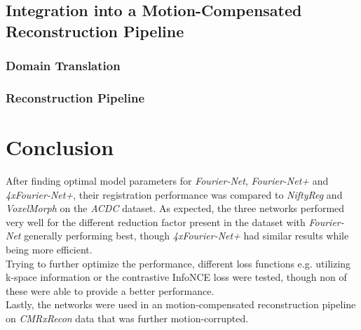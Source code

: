 \documentclass[english,version-2022-01]{uzl-thesis} %
\begin{document}
\section{Integration into a Motion-Compensated Reconstruction Pipeline} \label{Sec:DiscussionIntegrationMotion-CompensatedReconstructionPipeline}


\subsection{Domain Translation} \label{SubSec:DiscussionDomainTranslation}


\subsection{Reconstruction Pipeline} \label{SubSec:DiscussionReconstructionPipeline}



\chapter{Conclusion} \label{Ch:Conclusion}
After finding optimal model parameters for \emph{Fourier-Net}, \emph{Fourier-Net+} and \emph{4xFourier-Net+}, their registration performance was compared to \emph{NiftyReg} and \emph{VoxelMorph} on the \emph{ACDC} dataset. As expected, the three networks performed very well for the different reduction factor present in the dataset with \emph{Fourier-Net} generally performing best, though \emph{4xFourier-Net+} had similar results while being more efficient.\\
Trying to further optimize the performance, different loss functions e.g. utilizing k-space information or the contrastive InfoNCE loss were tested, though non of these were able to provide a better performance.\\
Lastly, the networks were used in an motion-compensated reconstruction pipeline on \emph{CMRxRecon} data that was further motion-corrupted.
\end{document}
